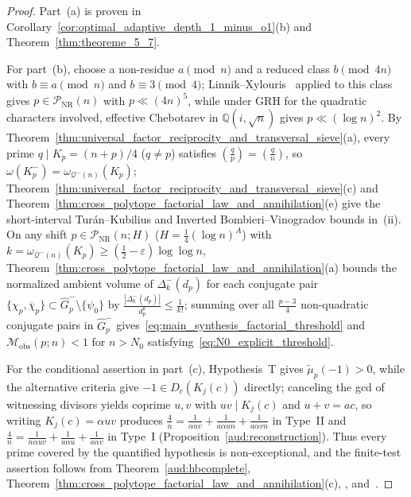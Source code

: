 \documentclass[11pt, a4paper]{article}
\theoremstyle{plain}
\theoremstyle{definition}
\newcommand{\Q}{\mathbb{Q}}
\newcommand{\leg}[2]{\left(\frac{#1}{#2}\right)}
\begin{document}
\begin{proof}
Part~(a) is proven in Corollary~\ref{cor:optimal_adaptive_depth_1_minus_o1}(b) and Theorem~\ref{thm:theoreme_5_7}.

For part~(b), choose a non-residue $a\pmod n$ and a reduced class $b\pmod{4n}$ with $b\equiv a\pmod n$ and $b\equiv3\pmod 4$; Linnik--Xylouris~\cite{xylouris2011} applied to this class gives $p\in\mathcal{P}_{\mathrm{NR}}(n)$ with $p\ll(4n)^{5}$, while under GRH for the quadratic characters involved, effective Chebotarev in $\Q(i,\sqrt{n})$ gives $p\ll(\log n)^{2}$. By Theorem~\ref{thm:universal_factor_reciprocity_and_transversal_sieve}(a), every prime $q\mid K_p=(n+p)/4$ ($q\neq p$) satisfies $\leg{q}{p}=\leg{q}{n}$, so $\omega(K_p^{-})=\omega_{\mathcal{Q}^{-}(n)}(K_p)$; Theorem~\ref{thm:universal_factor_reciprocity_and_transversal_sieve}(c) and Theorem~\ref{thm:cross_polytope_factorial_law_and_annihilation}(e) give the short-interval Tur\'{a}n--Kubilius and Inverted Bombieri--Vinogradov bounds in~(ii). On any shift $p\in\mathcal{P}_{\mathrm{NR}}(n;H)$ ($H=\frac14(\log n)^{A}$) with $k=\omega_{\mathcal{Q}^{-}(n)}(K_p)\ge(\frac12-\varepsilon)\log\log n$, Theorem~\ref{thm:cross_polytope_factorial_law_and_annihilation}(a) bounds the normalized ambient volume of $\Delta_k^{-}(d_p)$ for each conjugate pair $\{\chi_p,\overline{\chi}_p\}\subset\widehat{G}_p^{-}\setminus\{\psi_0\}$ by $\frac{|\Delta_k^{-}(d_p)|}{d_p^{k}}\le\frac{1}{k!}$; summing over all $\frac{p-3}{4}$ non-quadratic conjugate pairs in $\widehat{G}_p^{-}$ gives~\eqref{eq:main_synthesis_factorial_threshold} and $\mathcal{M}_{\mathrm{obs}}(p;n)<1$ for $n>N_0$ satisfying~\eqref{eq:N0_explicit_threshold}.

For the conditional assertion in part~(c), Hypothesis~T gives $\widetilde{\mu}_p(-1)>0$, while the alternative criteria give $-1\in D_c(K_j(c))$ directly; canceling the gcd of witnessing divisors yields coprime $u,v$ with $uv\mid K_j(c)$ and $u+v=ac$, so writing $K_j(c)=\alpha uv$ produces $\frac{4}{n}=\frac{1}{\alpha uv}+\frac{1}{a\alpha un}+\frac{1}{a\alpha vn}$ in Type~II and $\frac{4}{n}=\frac{1}{n\alpha uv}+\frac{1}{a\alpha u}+\frac{1}{a\alpha v}$ in Type~I (Proposition~\ref{aud:reconstruction}). Thus every prime covered by the quantified hypothesis is non-exceptional, and the finite-test assertion follows from Theorem~\ref{aud:hbcomplete}, Theorem~\ref{thm:cross_polytope_factorial_law_and_annihilation}(c), \cite[Thm.~3.9]{dahan2026a}, and~\cite{salez2014}.
\end{proof}
\end{document}
